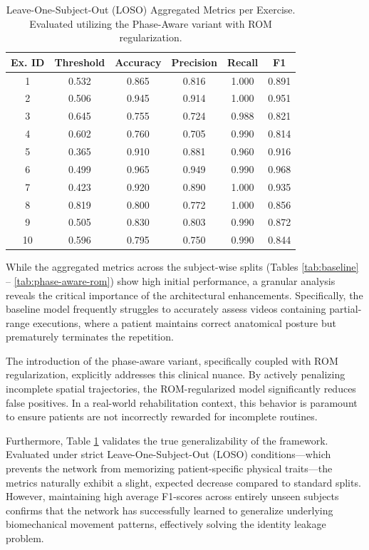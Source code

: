 \begin{table}[htbp]
    \centering
    \caption{Leave-One-Subject-Out (LOSO) Aggregated Metrics per Exercise. Evaluated utilizing the Phase-Aware variant with ROM regularization.}
    \label{tab:loso-metrics}
    \begin{tabularx}{0.8\textwidth}{@{} c c c c c c @{}}
        \toprule
        \textbf{Ex. ID} & \textbf{Threshold} & \textbf{Accuracy} & \textbf{Precision} & \textbf{Recall} & \textbf{F1} \\
        \midrule
        1  &  0.532 & 0.865 & 0.816 & 1.000 & 0.891 \\
        2  &  0.506 & 0.945 & 0.914 & 1.000 & 0.951 \\
        3  &  0.645 & 0.755 & 0.724 & 0.988 & 0.821 \\
        4  &  0.602 & 0.760 & 0.705 & 0.990 & 0.814 \\
        5  &  0.365 & 0.910 & 0.881 & 0.960 & 0.916 \\
        6  &  0.499 & 0.965 & 0.949 & 0.990 & 0.968 \\
        7  &  0.423 & 0.920 & 0.890 & 1.000 & 0.935 \\
        8  &  0.819 & 0.800 & 0.772 & 1.000 & 0.856 \\
        9  &  0.505 & 0.830 & 0.803 & 0.990 & 0.872 \\
        10 &  0.596 & 0.795 & 0.750 & 0.990 & 0.844 \\
        \bottomrule
    \end{tabularx}
\end{table}

While the aggregated metrics across the subject-wise splits (Tables \ref{tab:baseline} -- \ref{tab:phase-aware-rom}) show high initial performance, a granular analysis reveals the critical importance of the architectural enhancements. Specifically, the baseline model frequently struggles to accurately assess videos containing partial-range executions, where a patient maintains correct anatomical posture but prematurely terminates the repetition. 

The introduction of the phase-aware variant, specifically coupled with ROM regularization, explicitly addresses this clinical nuance. By actively penalizing incomplete spatial trajectories, the ROM-regularized model significantly reduces false positives. In a real-world rehabilitation context, this behavior is paramount to ensure patients are not incorrectly rewarded for incomplete routines.

Furthermore, Table \ref{tab:loso-metrics} validates the true generalizability of the framework. Evaluated under strict Leave-One-Subject-Out (LOSO) conditions—which prevents the network from memorizing patient-specific physical traits—the metrics naturally exhibit a slight, expected decrease compared to standard splits. However, maintaining high average F1-scores across entirely unseen subjects confirms that the network has successfully learned to generalize underlying biomechanical movement patterns, effectively solving the identity leakage problem.


